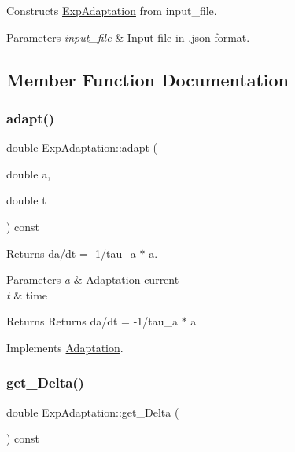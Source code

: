 Constructs \hyperlink{classExpAdaptation}{Exp\+Adaptation} from input\+\_\+file. 


\begin{DoxyParams}{Parameters}
{\em input\+\_\+file} & Input file in .json format. \\
\hline
\end{DoxyParams}


\subsection{Member Function Documentation}
\mbox{\label{classExpAdaptation_aef5119a0f09698f1526938f04654e3f4}} 
\subsubsection{\texorpdfstring{adapt()}{adapt()}}
{\footnotesize\ttfamily double Exp\+Adaptation\+::adapt (\begin{DoxyParamCaption}\item[{double}]{a,  }\item[{double}]{t }\end{DoxyParamCaption}) const\hspace{0.3cm}{\ttfamily [virtual]}}



Returns da/dt = -\/1/tau\+\_\+a $\ast$ a. 


\begin{DoxyParams}{Parameters}
{\em a} & \hyperlink{classAdaptation}{Adaptation} current \\
\hline
{\em t} & time \\
\hline
\end{DoxyParams}
\begin{DoxyReturn}{Returns}
Returns da/dt = -\/1/tau\+\_\+a $\ast$ a 
\end{DoxyReturn}


Implements \hyperlink{classAdaptation_a4c7f62690bb8639a307c0ed840890e30}{Adaptation}.

\mbox{\label{classExpAdaptation_ab99255b3adfe6fc0f2fcf2992f520565}} 
\subsubsection{\texorpdfstring{get\+\_\+\+Delta()}{get\_Delta()}}
{\footnotesize\ttfamily double Exp\+Adaptation\+::get\+\_\+\+Delta (\begin{DoxyParamCaption}{ }\end{DoxyParamCaption}) const\hspace{0.3cm}{\ttfamily [inline]}}



